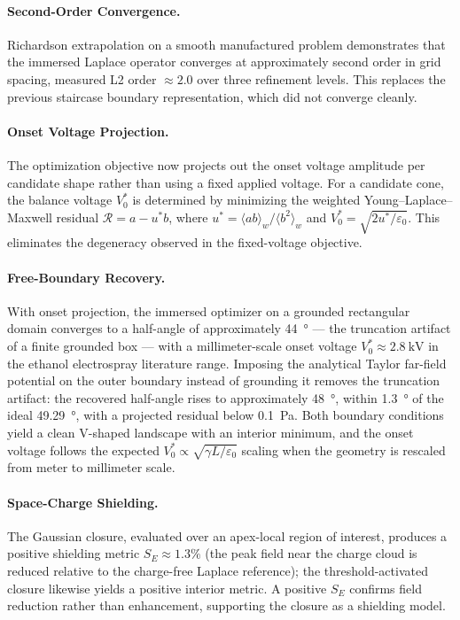 \paragraph{Second-Order Convergence.} Richardson extrapolation on a smooth manufactured problem demonstrates that the immersed Laplace operator converges at approximately second order in grid spacing, measured L2 order $\approx 2.0$ over three refinement levels. This replaces the previous staircase boundary representation, which did not converge cleanly.

\paragraph{Onset Voltage Projection.} The optimization objective now projects out the onset voltage amplitude per candidate shape rather than using a fixed applied voltage. For a candidate cone, the balance voltage $V_0^*$ is determined by minimizing the weighted Young--Laplace--Maxwell residual $\mathcal{R} = a - u^* b$, where $u^* = \langle ab \rangle_w / \langle b^2 \rangle_w$ and $V_0^* = \sqrt{2u^*/\varepsilon_0}$. This eliminates the degeneracy observed in the fixed-voltage objective.

\paragraph{Free-Boundary Recovery.} With onset projection, the immersed optimizer on a grounded rectangular domain converges to a half-angle of approximately \SI{44}{\degree} --- the truncation artifact of a finite grounded box --- with a millimeter-scale onset voltage $V_0^* \approx \SI{2.8}{\kV}$ in the ethanol electrospray literature range. Imposing the analytical Taylor far-field potential on the outer boundary instead of grounding it removes the truncation artifact: the recovered half-angle rises to approximately \SI{48}{\degree}, within \SI{1.3}{\degree} of the ideal \SI{49.29}{\degree}, with a projected residual below \SI{0.1}{Pa}. Both boundary conditions yield a clean V-shaped landscape with an interior minimum, and the onset voltage follows the expected $V_0^* \propto \sqrt{\gamma L / \varepsilon_0}$ scaling when the geometry is rescaled from meter to millimeter scale.

\paragraph{Space-Charge Shielding.} The Gaussian closure, evaluated over an apex-local region of interest, produces a positive shielding metric $S_E \approx 1.3\%$ (the peak field near the charge cloud is reduced relative to the charge-free Laplace reference); the threshold-activated closure likewise yields a positive interior metric. A positive $S_E$ confirms field reduction rather than enhancement, supporting the closure as a shielding model.


